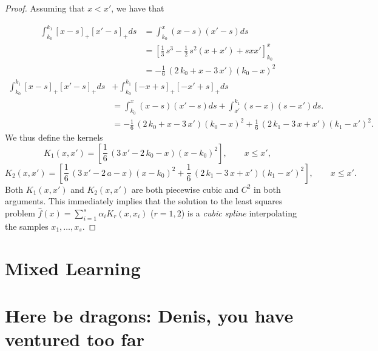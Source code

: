\begin{proof}
Assuming that $x < x'$, we have that


\begin{equation}
\begin{aligned}
\int_{k_0}^{k_1} [x-s]_+[x'-s]_+ ds &= \int_{k_0}^{x} (x-s)(x'-s) ds\\
&=
\left[\frac{1}{3} \, s^{3} - \frac{1}{2} \, s^{2} {\left(x + x'\right)} + s x x'\right]_{k_0}^{x}\\
&=-\frac{1}{6} \, {\left(2 \, k_0 + x - 3 \, x'\right)} {\left(k_0 - x\right)}^{2}
\end{aligned}
\end{equation}
\begin{equation}
\begin{aligned}
\int_{k_0}^{k_1} [x-s]_+[x'-s]_+ ds &+ \int_{k_0}^{k_1} [-x+s]_+[-x'+s]_+ ds\\
&= \int_{k_0}^{x} (x-s)(x'-s) ds 
+ \int_{x'}^{k_1} (s-x)(s-x') ds. \\
&=-\frac{1}{6} \, {\left(2 \, k_0 + x - 3 \, x'\right)} {\left(k_0 - x\right)}^{2} + \frac{1}{6} \, {\left(2 \, k_1 - 3 \, x + x'\right)} {\left(k_1 - x'\right)}^{2}.
\end{aligned}
\end{equation}
We thus define the kernels
\begin{equation}
K_1(x, x') = \left[\frac{1}{6} \, {\left(3 \, x' -2 \, k_0 - x\right)} {\left(x- k_0\right)}^{2}\right], \qquad x \le x',
\end{equation}
\begin{equation}
K_2(x, x') = \left[\frac{1}{6} \, {\left(3 \, x' - 2 \, a - x \right)} {\left(x - k_0\right)}^{2} + \frac{1}{6} \, {\left(2 \, k_1 - 3 \, x + x'\right)} {\left(k_1 - x'\right)}^{2} \right], \qquad x \le x'.
\end{equation}
Both $K_1(x,x')$ and $K_2(x,x')$ are both piecewise cubic and $C^2$ in both arguments.
This immediately implies that the solution to the least squares problem $\hat f(x) = \sum_{i=1}^s \alpha_i K_r(x,x_i)$ ($r=1,2$) is a \emph{cubic spline} interpolating the samples $x_1,\ldots,x_s$.
\end{proof}


\section{Mixed Learning}


\section{Here be dragons: Denis, you have ventured too far}

